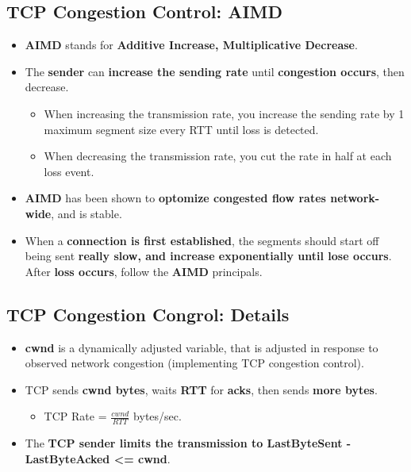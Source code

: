 \documentclass[16pt]{article}
\begin{document}
    \subsection*{TCP Congestion Control: AIMD}
    \begin{itemize}
        \item \textbf{AIMD} stands for \textbf{Additive Increase, Multiplicative Decrease}.
        \item The \textbf{sender} can \textbf{increase the sending rate} until \textbf{congestion occurs}, then decrease.
        \begin{itemize}
            \item When increasing the transmission rate, you increase the sending rate by 1 maximum segment size every RTT until loss is detected.
            \item When decreasing the transmission rate, you cut the rate in half at each loss event.
        \end{itemize}
        \item \textbf{AIMD} has been shown to \textbf{optomize congested flow rates network-wide}, and is stable.
        \item When a \textbf{connection is first established}, the segments should start off being sent \textbf{really slow, and increase exponentially until lose occurs}. After \textbf{loss occurs}, follow the \textbf{AIMD} principals.
    \end{itemize}

    \subsection*{TCP Congestion Congrol: Details}
    \begin{itemize}
        \item \textbf{cwnd} is a dynamically adjusted variable, that is adjusted in response to observed network congestion (implementing TCP congestion control).
        \item TCP sends \textbf{cwnd bytes}, waits \textbf{RTT} for \textbf{acks}, then sends \textbf{more bytes}.
        \begin{itemize}
            \item TCP Rate = $\frac{cwnd}{RTT}$ bytes/sec.
        \end{itemize}
        \item The \textbf{TCP sender limits the transmission to LastByteSent - LastByteAcked <= cwnd}. 
    \end{itemize}
\end{document}
